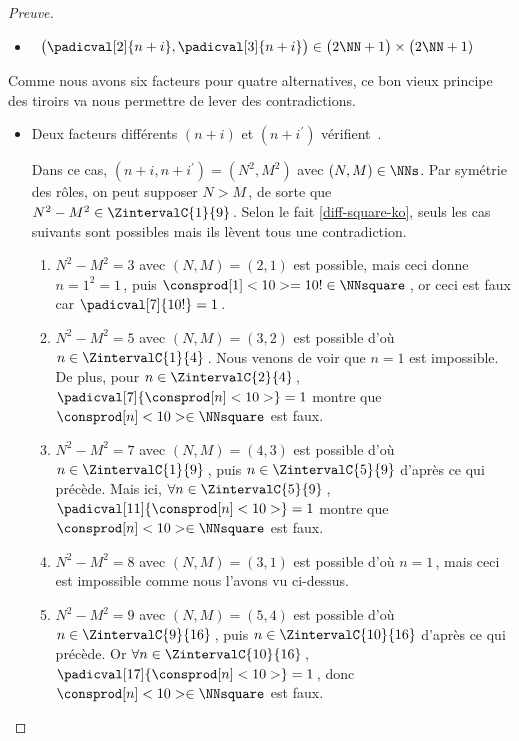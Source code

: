 \begin{proof}[Preuve]
\begin{itemize}
    	\smallskip
		\item {}\,
		$\big( \padicval[2]{n + i} , \padicval[3]{n + i} \big) \in \big( 2 \NN + 1 \big) \times \big( 2 \NN + 1)$
    \end{itemize}
    
    \medskip
    
    Comme nous avons six facteurs pour quatre alternatives, ce bon vieux principe des tiroirs va nous permettre de lever des contradictions.
    \begin{itemize}
    	\medskip
		\item Deux facteurs différents $(n+i)$ et $(n+i^\prime)$ vérifient \,.
		
		\smallskip
		\noindent
		Dans ce cas, $(n+i, n+i^\prime) = (N^2, M^2)$ avec $(N, M) \in \NNs$.
		Par symétrie des rôles, on peut supposer $N > M$\,, de sorte que $N^2 - M^2 \in \ZintervalC{1}{9}$\,. 
		Selon le fait \ref{diff-square-ko}, seuls les cas suivants sont possibles mais ils lèvent tous une contradiction.
		\begin{enumerate}
			\item $N^2 - M^2 = 3$ avec $(N, M) = (2, 1)$ est possible, mais ceci donne $n = 1^2 = 1$\,, puis $\consprod[1]<10> = 10 ! \in \NNsquare$\,, or ceci est faux car $\padicval[7]{10!} = 1$\,.


			\item $N^2 - M^2 = 5$ avec $(N, M) = (3, 2)$ est possible
			d'où $n \in \ZintervalC{1}{4}$\,.
			Nous venons de voir que $n = 1$ est impossible.
			De plus, pour $n \in \ZintervalC{2}{4}$\,, $\padicval[7]{\consprod[n]<10>} = 1$ montre que $\consprod[n]<10> \in \NNsquare$ est faux.
			

			\item $N^2 - M^2 = 7$ avec $(N, M) = (4, 3)$ est possible
			d'où $n \in \ZintervalC{1}{9}$\,, puis $n \in \ZintervalC{5}{9}$ d'après ce qui précède.
			Mais ici, $\forall n \in \ZintervalC{5}{9}$\,, $\padicval[11]{\consprod[n]<10>} = 1$ montre que $\consprod[n]<10> \in \NNsquare$ est faux.


			\item $N^2 - M^2 = 8$ avec $(N, M) = (3, 1)$ est possible
			d'où $n = 1$\,, mais ceci est impossible comme nous l'avons vu ci-dessus.


			\item $N^2 - M^2 = 9$ avec $(N, M) = (5, 4)$ est possible
			d'où $n \in \ZintervalC{9}{16}$\,, puis $n \in \ZintervalC{10}{16}$ d'après ce qui précède.
			Or $\forall n \in \ZintervalC{10}{16}$\,, $\padicval[17]{\consprod[n]<10>} = 1$\,, donc $\consprod[n]<10> \in \NNsquare$ est faux.
		\end{enumerate}



\end{itemize}
\end{proof}
